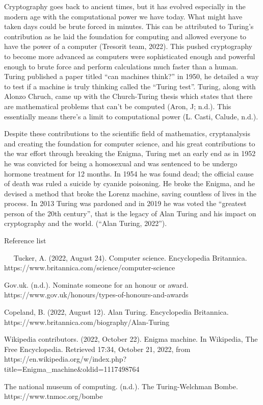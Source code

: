 \documentclass[11pt]{article}
\begin{document}
Cryptography goes back to ancient times, but it has evolved especially
in the modern age with the computational power we have today. What might
have taken days could be brute forced in minutes. This can be attributed
to Turing's contribution as he laid the foundation for computing and
allowed everyone to have the power of a computer (Tresorit team, 2022).
This pushed cryptography to become more advanced as computers were
sophisticated enough and powerful enough to brute force and perform
calculations much faster than a human. Turing published a paper titled
``can machines think?'' in 1950, he detailed a way to test if a machine
is truly thinking called the ``Turing test''. Turing, along with Alonzo
Chruch, came up with the Church-Turing thesis which states that there
are mathematical problems that can't be computed (Aron, J; n.d.). This
essentially means there's a limit to computational power (L. Casti,
Calude, n.d.).

Despite these contributions to the scientific field of mathematics,
cryptanalysis and creating the foundation for computer science, and his
great contributions to the war effort through breaking the Enigma,
Turing met an early end as in 1952 he was convicted for being a
homosexual and was sentenced to be undergo hormone treatment for 12
months. In 1954 he was found dead; the official cause of death was ruled
a suicide by cyanide poisoning. He broke the Enigma, and he devised a
method that broke the Lorenz machine, saving countless of lives in the
process. In 2013 Turing was pardoned and in 2019 he was voted the
``greatest person of the 20th century'', that is the legacy of Alan
Turing and his impact on cryptography and the world. (``Alan Turing,
2022'').

Reference list

  Tucker, A. (2022, August 24). Computer science. Encyclopedia
Britannica. https://www.britannica.com/science/computer-science

Gov.uk. (n.d.). Nominate someone for an honour or award.
https://www.gov.uk/honours/types-of-honours-and-awards

Copeland, B. (2022, August 12). Alan Turing. Encyclopedia Britannica.
https://www.britannica.com/biography/Alan-Turing

Wikipedia contributors. (2022, October 22). Enigma machine. In
Wikipedia, The Free Encyclopedia. Retrieved 17:34, October 21, 2022,
from
https://en.wikipedia.org/w/index.php?title=Enigma\_machine\&oldid=1117498764

The national museum of computing. (n.d.). The Turing-Welchman Bombe.
https://www.tnmoc.org/bombe
\end{document}
